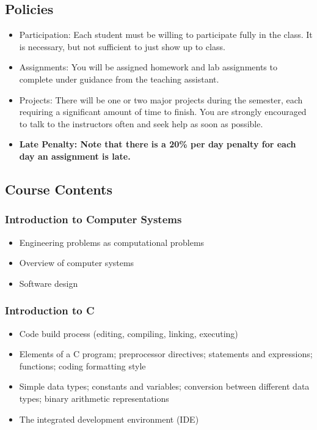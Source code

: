 \documentclass{article}
\begin{document}
\subsection{Policies}
\begin{itemize}
\item Participation: Each student must be willing to participate fully
  in the class. It is necessary, but not sufficient to just show up to class.
\item Assignments: You will be assigned homework and lab assignments to complete under guidance from the teaching assistant.
\item Projects: There will be one or two major projects during the
  semester, each requiring a significant amount of time to finish. You
  are strongly encouraged to talk to the instructors often and seek
  help as soon as possible.
\item \textbf{Late Penalty: Note that there is a 20\% per day penalty for each day an assignment is late.}
\end{itemize}

\subsection{Course Contents}
\subsubsection{Introduction to Computer Systems}
\begin{itemize}
\item Engineering problems as computational problems
\item Overview of computer systems
\item Software design
\end{itemize}

\subsubsection{Introduction to C}
\begin{itemize}
\item Code build process (editing, compiling, linking, executing)
\item Elements of a C program; preprocessor directives; statements and expressions; functions;
coding formatting style
\item Simple data types; constants and variables; conversion between different data types;
binary arithmetic representations
\item The integrated development environment (IDE)
\end{itemize}
\end{document}
